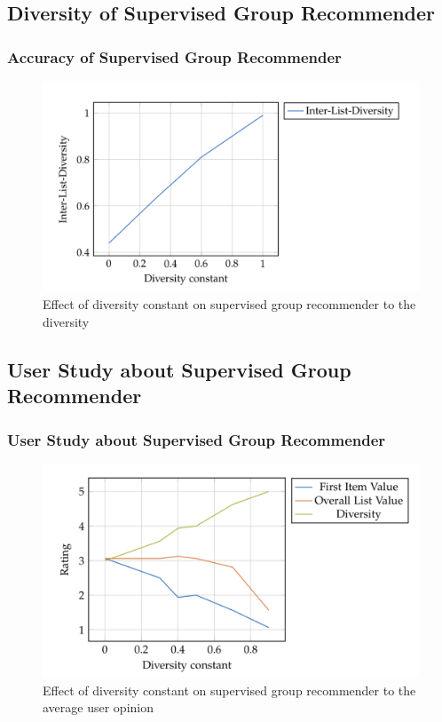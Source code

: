 \documentclass{beamer}
\begin{document}
\subsection{Diversity of Supervised Group Recommender} 
\begin{frame}
\frametitle{Accuracy of Supervised Group Recommender}
\begin{figure}
\includegraphics[scale=0.4]{images/supervised-group-diversity} 
\caption{Effect of diversity constant on supervised group recommender to the diversity}
\end{figure}
\end{frame}

\subsection{User Study about Supervised Group Recommender} 
\begin{frame}
\frametitle{User Study about Supervised Group Recommender}
\begin{figure}
\includegraphics[scale=0.4]{images/supervised-group-user} 
\caption{Effect of diversity constant on supervised group recommender to the average user opinion}
\end{figure}
\end{frame}
\end{document}
